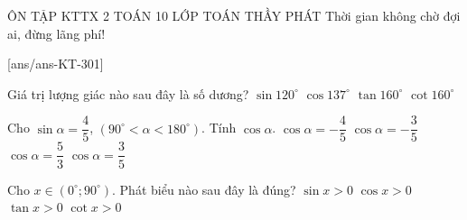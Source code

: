 \def\tenchude{ÔN TẬP KTTX 2}
\begin{name}
	{\tenchude}
	{TOÁN 10}
	{LỚP TOÁN THẦY PHÁT}
	{Thời gian không chờ đợi ai, đừng lãng phí!}
\end{name}

\setcounter{ex}{0}\setcounter{ex}{0}
[ans/ans-KT-301]

\begin{ex}
	Giá trị lượng giác nào sau đây là số dương?
	\choice
	{\True $\sin 120^\circ$}
	{$\cos 137^\circ$}
	{$\tan 160^\circ$}
	{$\cot 160^\circ$}
\end{ex}

\begin{ex}
	Cho $\sin\alpha=\dfrac{4}{5}$, $\left(90^\circ<\alpha <180^\circ\right)$. Tính $\cos\alpha $.
	\choice
	{$\cos\alpha=-\dfrac{4}{5}$}
	{\True $\cos\alpha=-\dfrac{3}{5}$}
	{$\cos\alpha=\dfrac{5}{3}$}
	{$\cos\alpha=\dfrac{3}{5}$}
\end{ex}

\begin{ex}
	Cho $x\in\left(0^\circ;90^\circ\right)$. Phát biểu nào sau đây là đúng?
	\choice
	{\True $\sin x>0$}
	{$\cos x>0$}
	{$\tan x>0$}
	{$\cot x>0$}
\end{ex}

